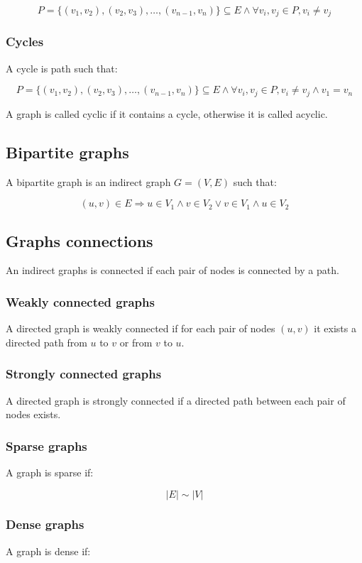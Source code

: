 		$$P=\{(v_1,v_2), (v_2, v_3), \dots, (v_{n-1}, v_n)\}\subseteq E\land\forall v_i,v_j\in P, v_i\neq v_j$$

		\subsubsection{Cycles}
		A cycle is path such that:

		$$P=\{(v_1,v_2), (v_2, v_3), \dots, (v_{n-1}, v_n)\}\subseteq E\land\forall v_i,v_j\in P, v_i\neq v_j\land v_1=v_n$$

		A graph is called cyclic if it contains a cycle, otherwise it is called acyclic.

	\subsection{Bipartite graphs}
	A bipartite graph is an indirect graph $G = (V,E)$ such that:

	$$(u,v)\in E\Rightarrow  u\in V_1 \land v\in V_2\lor v\in V_1\land u\in V_2$$

	\subsection{Graphs connections}
	An indirect graphs is connected if each pair of nodes is connected by a path.

		\subsubsection{Weakly connected graphs}
		A directed graph is weakly connected if for each pair of nodes $(u,v)$ it exists a directed path from $u$ to $v$ or from $v$ to $u$.

		\subsubsection{Strongly connected graphs}
		A directed graph is strongly connected if a directed path between each pair of nodes exists.

		\subsubsection{Sparse graphs}
		A graph is sparse if:

		$$|E|\sim|V|$$

		\subsubsection{Dense graphs}
		A graph is dense if:

